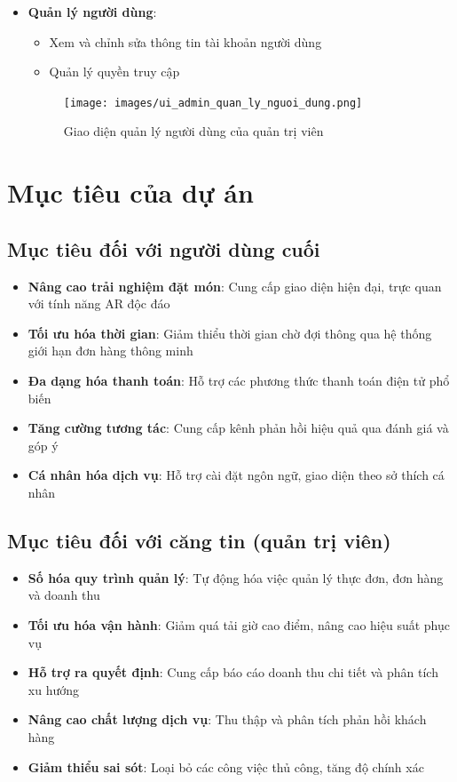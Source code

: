 \documentclass[12pt,a4paper]{article}
\begin{document}
\begin{itemize}[leftmargin=1cm]
    \item \textbf{Quản lý người dùng}:
        \begin{itemize}[leftmargin=0.5cm]
            \item Xem và chỉnh sửa thông tin tài khoản người dùng
            \item Quản lý quyền truy cập
        \end{itemize}
\begin{figure}[H]
    \centering
    \texttt{[image: images/ui\_admin\_quan\_ly\_nguoi\_dung.png]} %
    \caption{Giao diện quản lý người dùng của quản trị viên}
    \label{fig:ui_admin_users}
\end{figure}
\end{itemize}

\section{Mục tiêu của dự án}

\subsection{Mục tiêu đối với người dùng cuối}
\begin{itemize}[leftmargin=1cm]
    \item \textbf{Nâng cao trải nghiệm đặt món}: Cung cấp giao diện hiện đại, trực quan với tính năng AR độc đáo
    \item \textbf{Tối ưu hóa thời gian}: Giảm thiểu thời gian chờ đợi thông qua hệ thống giới hạn đơn hàng thông minh
    \item \textbf{Đa dạng hóa thanh toán}: Hỗ trợ các phương thức thanh toán điện tử phổ biến
    \item \textbf{Tăng cường tương tác}: Cung cấp kênh phản hồi hiệu quả qua đánh giá và góp ý
    \item \textbf{Cá nhân hóa dịch vụ}: Hỗ trợ cài đặt ngôn ngữ, giao diện theo sở thích cá nhân
\end{itemize}

\subsection{Mục tiêu đối với căng tin (quản trị viên)}
\begin{itemize}[leftmargin=1cm]
    \item \textbf{Số hóa quy trình quản lý}: Tự động hóa việc quản lý thực đơn, đơn hàng và doanh thu
    \item \textbf{Tối ưu hóa vận hành}: Giảm quá tải giờ cao điểm, nâng cao hiệu suất phục vụ
    \item \textbf{Hỗ trợ ra quyết định}: Cung cấp báo cáo doanh thu chi tiết và phân tích xu hướng
    \item \textbf{Nâng cao chất lượng dịch vụ}: Thu thập và phân tích phản hồi khách hàng
    \item \textbf{Giảm thiểu sai sót}: Loại bỏ các công việc thủ công, tăng độ chính xác
\end{itemize}
\end{document}
